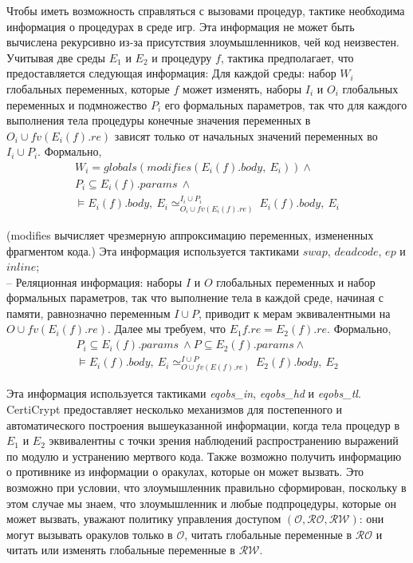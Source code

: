 \documentclass[a4paper,12pt]{report}
\begin{document}
Чтобы иметь возможность справляться с вызовами процедур, тактике необходима информация о процедурах в среде игр. Эта информация не может быть вычислена рекурсивно из-за присутствия злоумышленников, чей код неизвестен. Учитывая две среды $E_1$ и $E_2$ и процедуру $f$, тактика предполагает, что предоставляется следующая информация:
Для каждой среды: набор $W_i$ глобальных переменных, которые $f$ может изменять, наборы $I_i$ и $O_i$ глобальных переменных и подмножество $P_i$ его формальных параметров, так что для каждого выполнения тела процедуры конечные значения переменных в $O_i \cup fv (E_i(f).re)$ зависят только от начальных значений переменных во $I_i \cup P_i$. Формально,
\begin{align*}
  W_i = globals(modifies(E_i(f).body, \ E_i)) \wedge \\
  P_i \subseteq E_i(f).params \ \wedge \\
  \models E_i(f).body, \ E_i \simeq^{I_i \cup P_i}_{O_i \cup fv(E_i(f).re)} \ E_i(f).body, \ E_i
\end{align*}

(modifies вычисляет чрезмерную аппроксимацию переменных, измененных фрагментом кода.) Эта информация используется тактиками $swap$, $deadcode$, $ep$ и $inline$; \\
– Реляционная информация: наборы $I$ и $O$ глобальных переменных и набор формальных параметров, так что выполнение тела в каждой среде, начиная с памяти, равнозначно переменным $I \cup P$, приводит к мерам эквивалентными на $O \cup fv(E_i(f).re)$. Далее мы требуем, что $E_1{f}.re = E_2(f).re$. Формально,
\begin{align*}
  P_i \subseteq E_i(f).params \ \wedge P \subseteq E_2(f).params \wedge \\
  \models E_i(f).body, \ E_i \simeq^{I \cup P}_{O \cup fv(E(f).re)} \ E_2(f).body, \ E_2
\end{align*}


Эта информация используется тактиками \textit{eqobs\_in}, \textit{eqobs\_hd} и \textit{eqobs\_tl}. CertiCrypt предоставляет несколько механизмов для постепенного и автоматического построения вышеуказанной информации, когда тела процедур в $E_1$ и $E_2$ эквивалентны с точки зрения наблюдений распространению выражений по модулю и устранению мертвого кода. Также возможно получить информацию о противнике из информации о оракулах, которые он может вызвать. Это возможно при условии, что злоумышленник правильно сформирован, поскольку в этом случае мы знаем, что злоумышленник и любые подпроцедуры, которые он может вызвать, уважают политику управления доступом $(\mathcal{O}, \mathcal{RO}, \mathcal{RW})$: они могут вызывать оракулов только в $\mathcal{O}$, читать глобальные переменные в $\mathcal{RO}$ и читать или изменять глобальные переменные в $\mathcal{RW}$. 
\end{document}
